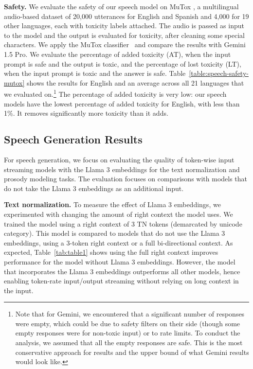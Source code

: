 \textbf{Safety.}
We evaluate the safety of our speech model on MuTox \citep{mutox}, a multilingual audio-based dataset of 20,000 utterances for English and Spanish and 4,000 for 19 other languages, each with toxicity labels attached.
The audio is passed as input to the model and the output is evaluated for toxicity, after cleaning some special characters.
We apply the MuTox classifier~\citep{mutox} and compare the results with Gemini 1.5 Pro. We evaluate the percentage of added toxicity (AT), when the input prompt is safe and the output is toxic, and the percentage of lost toxicity (LT), when the input prompt is toxic and the answer is safe. Table~\ref{table:speech-safety-mutox} shows the results for English and an average across all 21 languages that we evaluated on.\footnote{Note that for Gemini, we encountered that a significant number of responses were empty, which could be due to safety filters on their side (though some empty responses were for non-toxic input) or to rate limits. To conduct the analysis, we assumed that all the empty responses are safe. This is the most conservative approach for results and the upper bound of what Gemini results would look like.} The percentage of added toxicity is very low: our speech models have the lowest percentage of added toxicity for English, with less than 1\%. It removes significantly more toxicity than it adds.


\subsection{Speech Generation Results}
For speech generation, we focus on evaluating the quality of token-wise input streaming models with the Llama 3 embeddings for the text normalization and prosody modeling tasks. The evaluation focuses on comparisons with models that do not take the Llama 3 embeddings as an additional input.

\textbf{Text normalization.}
To measure the effect of Llama 3 embeddings, we experimented with changing the amount of right context the model uses. We trained the model using a right context of 3 TN tokens (demarcated by unicode category). This model is compared to models that do not use the Llama 3 embeddings, using a 3-token right context or a full bi-directional context.
As expected, Table~\ref{tab:table1} shows using the full right context improves performance for the model without Llama 3 embeddings. However, the model that incorporates the Llama 3 embeddings outperforms all other models, hence enabling token-rate input/output streaming without relying on long context in the input.

